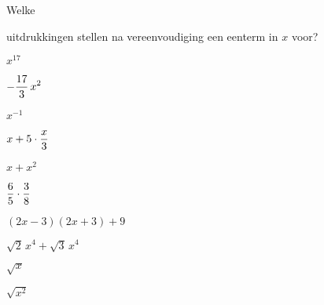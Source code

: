 \documentclass{ximera}
\begin{document}
	\author{Koen De Naeghel - Wiskunde Op Maat}
	\xmsource
	\label{xim:veeltermen_basisbegrippen_oefeningen_reeks1}


\begin{exercise}
\hypertarget{oef1.1}{Welke} uitdrukkingen stellen na vereenvoudiging een eenterm in $x$ voor? 
\renewcommand{\TJa }{\makebox[2.5cm]{Een eenterm }}
\renewcommand{\TNee}{\makebox[2.5cm]{Geen eenterm}}

\begin{multicols}{2}
	\begin{question} \choiceYes  \( x^{17}                         \)   \end{question}
	\begin{question} \choiceYes  \( \displaystyle -\frac{17}{3}\,x^2          \)   \end{question}
	\begin{question} \choiceNo   \( x^{-1}                         \)   \end{question}
	\begin{question} \choiceYes  \( \displaystyle x + 5\cdot \frac{x}{3}      \)   \end{question}
	\begin{question} \choiceNo   \( x + x^2                        \)   \end{question}
	\begin{question} \choiceYes  \( \displaystyle \frac{6}{5}\cdot\frac{3}{8} \)   \end{question}
	\begin{question} \choiceYes  \( (2x-3)(2x+3)+9                 \)   \end{question}
	\begin{question} \choiceYes  \( \sqrt{2}\,x^4 + \sqrt{3}\,x^4  \)   \end{question}
	\begin{question} \choiceNo   \( \sqrt{x}                       \)   \end{question}
	\begin{question} \choiceNo   \( \sqrt{x^2}                     \)   \end{question}
\end{multicols}
\end{exercise}
\end{document}

